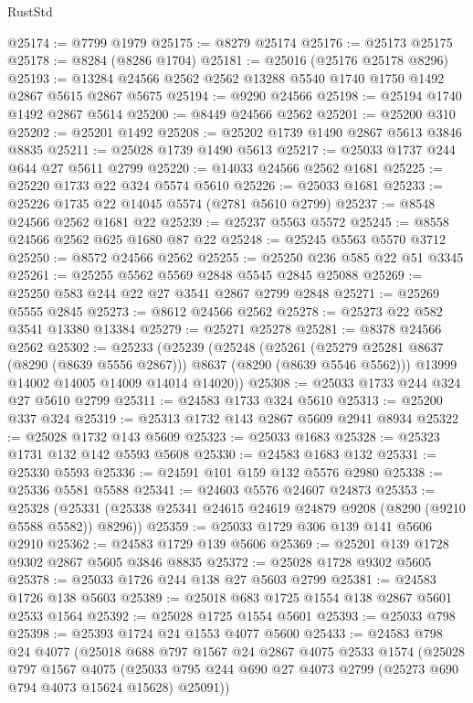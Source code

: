 \begin{lexlean}{RustStd}
\begin{coremodule}
@25174 := @7799 @1979
@25175 := @8279 @25174
@25176 := @25173 @25175
@25178 := @8284 (@8286 @1704)
@25181 := @25016 (@25176 @25178 @8296)
@25193 := @13284 @24566 @2562 @2562 @13288 @5540 @1740 @1750 @1492 @2867 @5615 @2867 @5675
@25194 := @9290 @24566
@25198 := @25194 @1740 @1492 @2867 @5614
@25200 := @8449 @24566 @2562
@25201 := @25200 @310
@25202 := @25201 @1492
@25208 := @25202 @1739 @1490 @2867 @5613 @3846 @8835
@25211 := @25028 @1739 @1490 @5613
@25217 := @25033 @1737 @244 @644 @27 @5611 @2799
@25220 := @14033 @24566 @2562 @1681
@25225 := @25220 @1733 @22 @324 @5574 @5610
@25226 := @25033 @1681
@25233 := @25226 @1735 @22 @14045 @5574 (@2781 @5610 @2799)
@25237 := @8548 @24566 @2562 @1681 @22
@25239 := @25237 @5563 @5572
@25245 := @8558 @24566 @2562 @625 @1680 @87 @22
@25248 := @25245 @5563 @5570 @3712
@25250 := @8572 @24566 @2562
@25255 := @25250 @236 @585 @22 @51 @3345
@25261 := @25255 @5562 @5569 @2848 @5545 @2845 @25088
@25269 := @25250 @583 @244 @22 @27 @3541 @2867 @2799 @2848
@25271 := @25269 @5555 @2845
@25273 := @8612 @24566 @2562
@25278 := @25273 @22 @582 @3541 @13380 @13384
@25279 := @25271 @25278
@25281 := @8378 @24566 @2562
@25302 := @25233
    (@25239
      (@25248
        (@25261 (@25279 @25281 @8637 (@8290 (@8639 @5556 @2867))) @8637 (@8290 (@8639 @5546 @5562)))
        @13999
        @14002
        @14005
        @14009
        @14014
        @14020))
@25308 := @25033 @1733 @244 @324 @27 @5610 @2799
@25311 := @24583 @1733 @324 @5610
@25313 := @25200 @337 @324
@25319 := @25313 @1732 @143 @2867 @5609 @2941 @8934
@25322 := @25028 @1732 @143 @5609
@25323 := @25033 @1683
@25328 := @25323 @1731 @132 @142 @5593 @5608
@25330 := @24583 @1683 @132
@25331 := @25330 @5593
@25336 := @24591 @101 @159 @132 @5576 @2980
@25338 := @25336 @5581 @5588
@25341 := @24603 @5576 @24607 @24873
@25353 := @25328
    (@25331 (@25338 @25341 @24615 @24619 @24879 @9208 (@8290 (@9210 @5588 @5582)) @8296))
@25359 := @25033 @1729 @306 @139 @141 @5606 @2910
@25362 := @24583 @1729 @139 @5606
@25369 := @25201 @139 @1728 @9302 @2867 @5605 @3846 @8835
@25372 := @25028 @1728 @9302 @5605
@25378 := @25033 @1726 @244 @138 @27 @5603 @2799
@25381 := @24583 @1726 @138 @5603
@25389 := @25018 @683 @1725 @1554 @138 @2867 @5601 @2533 @1564
@25392 := @25028 @1725 @1554 @5601
@25393 := @25033 @798
@25398 := @25393 @1724 @24 @1553 @4077 @5600
@25433 := @24583
    @798
    @24
    @4077
    (@25018
      @688
      @797
      @1567
      @24
      @2867
      @4075
      @2533
      @1574
      (@25028
        @797
        @1567
        @4075
        (@25033 @795 @244 @690 @27 @4073 @2799 (@25273 @690 @794 @4073 @15624 @15628) @25091))

\end{coremodule}
\end{lexlean}
